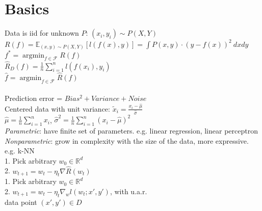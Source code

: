 
\section*{Basics}

Data is iid for unknown $P$: $(x_i, y_i) \sim P(X,Y)$\\
$R(f) = \mathbb{E}_{(x,y)\sim P(X,Y)}[l(f(x),y)] = \int P(x,y) \cdot (y-f(x))^2 \  dx dy$\\
$f^* = \operatorname{argmin}_{f\in\mathcal{F}} R(f)$\\
$\hat{R}_D (f) = \frac{1}{n} \sum_{i = 1}^{n} l (f(x_i),y_i) $\\
$\hat{f} = \operatorname{argmin}_{f\in\mathcal{F}} \hat{R}(f) $\\
\\
Prediction error = $Bias^2 + Variance + Noise$\\
Centered data with unit variance:
$\tilde{x}_{i} = \frac{x_{i}-\hat{\mu}}{\hat{\sigma}}$\\
$\hat{\mu} = \frac{1}{n}\sum_{i=1}^n x_{i}$, $\hat{\sigma}^2 = \frac{1}{n}\sum_{i=1}^n {(x_{i}-\hat{\mu})}^2$ \\
\emph{Parametric}: have finite set of parameters. 
e.g. linear regression, linear perceptron\\
\emph{Nonparametric}: grow in complexity with the size of the data, more expressive.
e.g. k-NN
\\
1. Pick arbitrary $w_0 \in \mathbb{R}^d$\\
2. $w_{t+1} = w_t - \eta_t \nabla \hat{R}(w_t)$
\\
1. Pick arbitrary $w_0 \in \mathbb{R}^d$\\
2. $w_{t+1} = w_t - \eta_t \nabla_w l(w_t;x',y')$, with u.a.r.\\ data point $(x',y') \in D$
